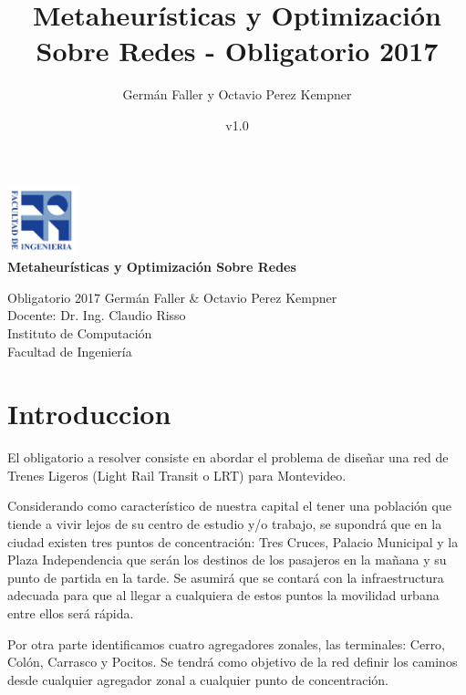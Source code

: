 \documentclass{extarticle}
\title{Metaheurísticas y Optimización Sobre Redes - Obligatorio 2017}
\author{Germán Faller y Octavio Perez Kempner}
\date{v1.0}
\begin{document}
\begin{titlepage}
    \begin{center}
    	\includegraphics[width=2cm]{img/logo_FING_rgb.jpg}
    	\\
        \vspace*{1cm}
        \huge{\textbf{Metaheurísticas y Optimización Sobre Redes}}
        
        \vspace{0.5cm}
       Obligatorio 2017
        \vspace{2cm}
        \vfill
        \Large{
        Germán Faller \& Octavio Perez Kempner\\Docente: Dr. Ing. Claudio Risso \\ Instituto de Computación \\ Facultad de Ingeniería}
        
        \vfill
        \vspace{0.8cm}
    \end{center} 
\end{titlepage}

\tableofcontents 

\newpage
\section{Introduccion}

El obligatorio a resolver consiste en abordar el problema de diseñar una red de Trenes Ligeros (Light Rail Transit o LRT) para Montevideo.

Considerando como característico de nuestra capital el tener una población que tiende a vivir lejos de su centro de estudio y/o trabajo, se supondrá que en la ciudad existen tres puntos de concentración: Tres Cruces, Palacio Municipal y la Plaza Independencia que serán los destinos de los pasajeros en la mañana y su punto de partida en la tarde. Se asumirá que se contará con la infraestructura adecuada para que al llegar a cualquiera de estos puntos la movilidad urbana entre ellos será rápida.

Por otra parte identificamos cuatro agregadores zonales, las terminales: Cerro, Colón, Carrasco y Pocitos. Se tendrá como objetivo de la red definir los caminos desde cualquier agregador zonal a cualquier punto de concentración.
\end{document}
